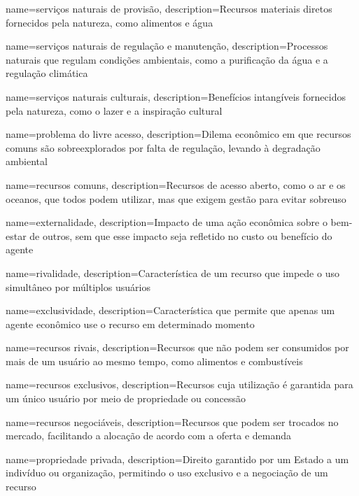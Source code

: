 {
	name=serviços naturais de provisão,
	description={Recursos materiais diretos fornecidos pela natureza, como alimentos e água}
}

{
	name=serviços naturais de regulação e manutenção,
	description={Processos naturais que regulam condições ambientais, como a purificação da água e a regulação climática}
}

{
	name=serviços naturais culturais,
	description={Benefícios intangíveis fornecidos pela natureza, como o lazer e a inspiração cultural}
}

{
	name=problema do livre acesso,
	description={Dilema econômico em que recursos comuns são sobreexplorados por falta de regulação, levando à degradação ambiental}
}

{
	name=recursos comuns,
	description={Recursos de acesso aberto, como o ar e os oceanos, que todos podem utilizar, mas que exigem gestão para evitar sobreuso}
}

{
	name=externalidade,
	description={Impacto de uma ação econômica sobre o bem-estar de outros, sem que esse impacto seja refletido no custo ou benefício do agente}
}

{
	name=rivalidade,
	description={Característica de um recurso que impede o uso simultâneo por múltiplos usuários}
}

{
	name=exclusividade,
	description={Característica que permite que apenas um agente econômico use o recurso em determinado momento}
}

{
	name=recursos rivais,
	description={Recursos que não podem ser consumidos por mais de um usuário ao mesmo tempo, como alimentos e combustíveis}
}

{
	name=recursos exclusivos,
	description={Recursos cuja utilização é garantida para um único usuário por meio de propriedade ou concessão}
}

{
	name=recursos negociáveis,
	description={Recursos que podem ser trocados no mercado, facilitando a alocação de acordo com a oferta e demanda}
}

{
	name=propriedade privada,
	description={Direito garantido por um Estado a um indivíduo ou organização, permitindo o uso exclusivo e a negociação de um recurso}
}

